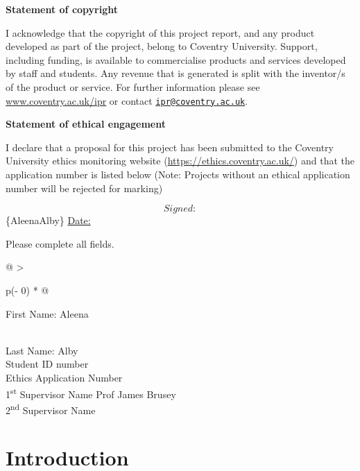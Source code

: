 \documentclass[
]{article}
\begin{document}
\textbf{Statement of copyright}

I acknowledge that the copyright of this project report, and any product
developed as part of the project, belong to Coventry University.
Support, including funding, is available to commercialise products and
services developed by staff and students. Any revenue that is generated
is split with the inventor/s of the product or service. For further
information please see
\href{http://www.coventry.ac.uk/ipr}{www.coventry.ac.uk/ipr} or contact
\href{mailto:ipr@coventry.ac.uk}{\nolinkurl{ipr@coventry.ac.uk}}.

\textbf{Statement of ethical engagement}

I declare that a proposal for this project has been submitted to the
Coventry University ethics monitoring website
(\url{https://ethics.coventry.ac.uk/}) and that the application number
is listed below (Note: Projects without an ethical application number
will be rejected for marking)

\[Signed:\]\{AleenaAlby\} \underline{Date:}

Please complete all fields.

\begin{longtable}[]{@{}
  >{\raggedright\arraybackslash}p{(\columnwidth - 0\tabcolsep) * }@{}}
\toprule
\begin{minipage}[b]{\linewidth}\raggedright
First Name: Aleena
\end{minipage} \\
\midrule
\endhead
Last Name: Alby \\
Student ID number \\
Ethics Application Number \\
1\textsuperscript{st} Supervisor Name Prof James Brusey \\
2\textsuperscript{nd} Supervisor Name \\
\bottomrule
\end{longtable}

\pagebreak
\tableofcontents
\pagebreak
\listoftables
\pagebreak
\listoffigures 
\pagebreak

\hypertarget{introduction}{%
\section{Introduction}\label{introduction}}
\end{document}
